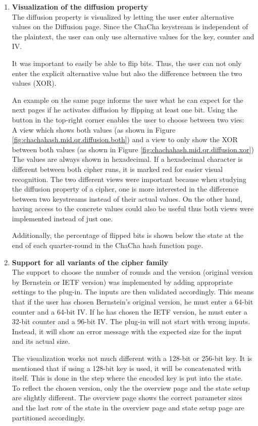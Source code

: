 \begin{enumerate}[label=(\labelenum{G}{{\arabic*}}), wide, labelwidth=!, labelindent=0pt]
     \item \textbf{Visualization of the diffusion property}\\
     The diffusion property is visualized by letting the user enter alternative values on the Diffusion page. Since the ChaCha keystream is independent of the plaintext, the user can only use alternative values for the key, counter and IV.
     
     It was important to easily be able to flip bits. Thus, the user can not only enter the explicit alternative value but also the difference between the two values (XOR).
     
     An example on the same page informs the user what he can expect for the next pages if he activates diffusion by flipping at least one bit. Using the button in the top-right corner enables the user to choose between two vies: \\
     A view which shows both values (as shown in Figure \autoref{fig:chachahash.mid.qr.diffusion.both}) and a view to only show the XOR between both values (as shown in Figure \autoref{fig:chachahash.mid.qr.diffusion.xor})\\
     The values are always shown in hexadecimal. If a hexadecimal character is different between both cipher runs, it is marked red for easier visual recognition. The two different views were important because when studying the diffusion property of a cipher, one is more interested in the difference between two keystreams instead of their actual values. On the other hand, having access to the concrete values could also be useful thus both views were implemented instead of just one.
     
     Additionally, the percentage of flipped bits is shown below the state at the end of each quarter-round in the ChaCha hash function page.
     
     \item \textbf{Support for all variants of the cipher family}\\
     The support to choose the number of rounds and the version (original version by Bernstein or IETF version) was implemented by adding appropriate settings to the plug-in. The inputs are then validated accordingly. This means that if the user has chosen Bernstein's original version, he must enter a 64-bit counter and a 64-bit IV. If he has chosen the IETF version, he must enter a 32-bit counter and a 96-bit IV. The plug-in will not start with wrong inputs. Instead, it will show an error message with the expected size for the input and its actual size.
     
     The visualization works not much different with a 128-bit or 256-bit key. It is mentioned that if using a 128-bit key is used, it will be concatenated with itself. This is done in the step where the encoded key is put into the state.\\
     To reflect the chosen version, only the the overview page and the state setup are slightly different. The overview page shows the correct parameter sizes and the last row of the state in the overview page and state setup page are partitioned accordingly.
  \end{enumerate}

